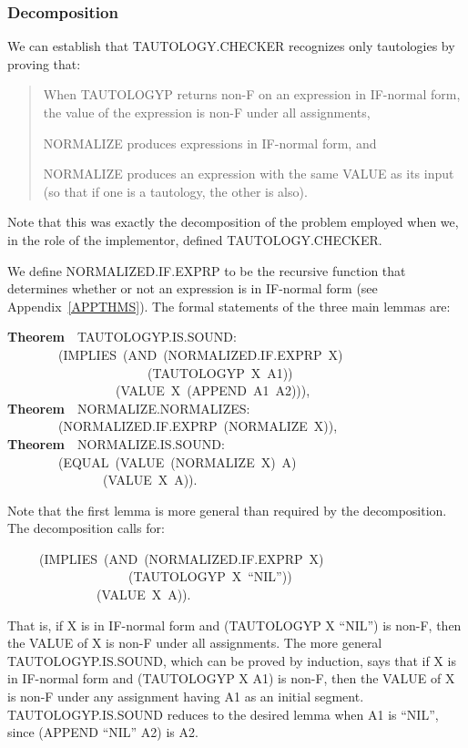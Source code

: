 \documentclass[10pt]{book}
\newenvironment{pubasis}{\begin{flushleft}}{\end{flushleft}}
\newenvironment{pubcrown}{\begin{quote}}{\end{quote}}
\newcommand{\axiomordefinition}[1]{\vspace{6pt}\Large\textsf{\textbf{#1}}\normalsize}
\begin{document}
\subsubsection{Decomposition}
We can establish that TAUTOLOGY.CHECKER recognizes only tautologies by proving that:
\begin{pubcrown}
When TAUTOLOGYP returns non-F on an expression in
IF-normal form, the value of the expression is non-F under all assignments,

NORMALIZE produces expressions in IF-normal form, and

NORMALIZE produces an expression with the same VALUE
as its input (so that if one is a tautology, the other is also).
\end{pubcrown}

Note that this was exactly the decomposition of the problem employed
when we, in the role of the implementor, defined TAUTOLOGY.CHECKER.

We define NORMALIZED.IF.EXPRP to be the recursive function that determines
whether or not an expression is in IF-normal form  (see Appendix~\ref{APPTHMS}).
The formal statements of the three main lemmas are:

\begin{pubasis}
\axiomordefinition{Theorem}~~TAUTOLOGYP.IS.SOUND:\\
~~~~~~~~(IMPLIES~(AND~(NORMALIZED.IF.EXPRP~X)\\
~~~~~~~~~~~~~~~~~~~~~~(TAUTOLOGYP~X~A1))\\
~~~~~~~~~~~~~~~~~(VALUE~X~(APPEND~A1~A2))),\\

\axiomordefinition{Theorem}~~NORMALIZE.NORMALIZES:\\
~~~~~~~~(NORMALIZED.IF.EXPRP~(NORMALIZE~X)),\\

\axiomordefinition{Theorem}~~NORMALIZE.IS.SOUND:\\
~~~~~~~~(EQUAL~(VALUE~(NORMALIZE~X)~A)\\
~~~~~~~~~~~~~~~(VALUE~X~A)).\\
\end{pubasis}
Note that the first lemma is more general than required by the decomposition.
The decomposition calls for:

\begin{pubasis}
~~~~~(IMPLIES~(AND~(NORMALIZED.IF.EXPRP~X)\\
~~~~~~~~~~~~~~~~~~~(TAUTOLOGYP~X~``NIL''))\\
~~~~~~~~~~~~~~(VALUE~X~A)).\\
\end{pubasis}
That is, if X is in IF-normal form and (TAUTOLOGYP X ``NIL'')
is non-F, then the VALUE of X is non-F under all assignments.
The more general
TAUTOLOGYP.IS.SOUND, which can be proved by induction,  says that if X is in IF-normal form and
(TAUTOLOGYP X A1) is non-F, then the VALUE of X is
non-F under any assignment having A1 as an initial segment.  TAUTOLOGYP.IS.SOUND
reduces to the desired lemma when A1 is ``NIL'', since (APPEND ``NIL'' A2) is A2.
\end{document}
